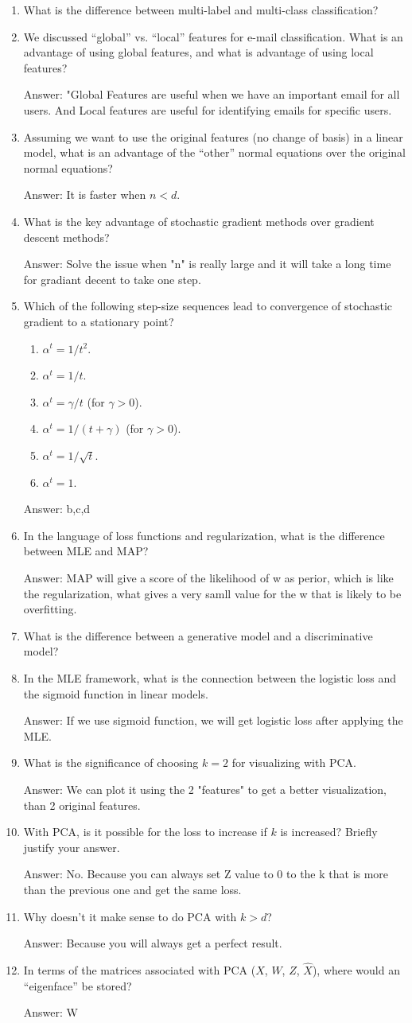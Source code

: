 \documentclass{article}
\def\ans#1{\par\gre{Answer: #1}}
\def\gre#1{{\color{gre}#1}}
\def\enum#1{\begin{enumerate}#1\end{enumerate}}
\begin{document}
\enum{
\item What is the difference between multi-label and multi-class classification?
\item We discussed ``global'' vs. ``local'' features for e-mail classification. What is an advantage of using global features, and what is advantage of using local features?
\ans{"Global Features are useful when we have an important email for all users. And Local features are useful for identifying emails for specific users.}
\item Assuming we want to use the original features (no change of basis) in a linear model, what is an advantage of the ``other'' normal equations over the original normal equations?
\ans{It is faster when $n<d$.}
\item What is the key advantage of stochastic gradient methods over gradient descent methods?
\ans{Solve the issue when "n" is really large and it will take a long time for gradiant decent to take one step.}
\item Which of the following step-size sequences lead to convergence of stochastic gradient to a stationary point?
\enum{
\item $\alpha^t = 1/t^2$.
\item $\alpha^t = 1/t$.
\item $\alpha^t = \gamma/t$ (for $\gamma > 0$).
\item $\alpha^t = 1/(t+\gamma)$ (for $\gamma > 0$).
\item $\alpha^t = 1/\sqrt{t}$.
\item $\alpha^t = 1$.
}
\ans{b,c,d}
\item In the language of loss functions and regularization, what is the difference between MLE and MAP?
\ans{MAP will give a score of the likelihood of w as perior, which is like the regularization, what gives a very samll value for the w that is likely to be overfitting. }
\item What is the difference between a generative model and a discriminative model?
\item In the MLE framework, what is the connection between the logistic loss and the sigmoid function in linear models.
\ans{If we use sigmoid function, we will get logistic loss after applying the MLE.}
\item What is the significance of choosing $k=2$ for visualizing with PCA.
\ans{We can plot it using the 2 "features" to get a better visualization, than 2 original features.}
\item With PCA, is it possible for the loss to increase if $k$ is increased? Briefly justify your answer.
\ans{No. Because you can always set Z value to 0 to the k that is more than the previous one and get the same loss.}
\item Why doesn't it make sense to do PCA with $k > d$?
\ans{Because you will always get a perfect result.}
\item In terms of the matrices associated with PCA ($X$, $W$, $Z$, $\hat{X}$), where would an ``eigenface'' be stored?
\ans{W}
}
\end{document}
